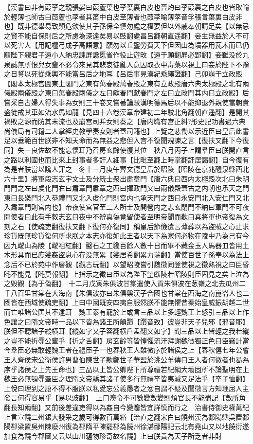 【漢書曰非有葭莩之親張晏曰葭蘆葉也莩葉裏白皮也晉灼曰莩葭裏之白皮也皆取喻於輕薄也師古曰葭蘆也莩者其筩中白皮至薄者也葭莩喻薄莩音孚張言葉裏白皮非也】既非德舉易致顛危欲使其子孫保全慎勿處之權要但以外戚奉朝請足矣【以無忌之賢不能自保則后之所慮為深遠矣易以豉翻處昌呂翻朝直遥翻】妾生無益於人不可以死害人【用記檀弓成子高語意】願勿以丘壟勞費天下但因山為墳器用瓦木而已仍願陛下親君子遠小人納忠諫屏讒慝省作役止遊畋【遠于願翻屛必郢翻】妾雖没於九泉誠無所恨兒女輩不必令來見其悲哀徒亂人意因取衣中毒藥以視上曰妾於陛下不豫之日誓以死從乘輿不能當呂后之地耳【呂后事見漢紀乘繩證翻】己卯崩于立政殿【閣本太極宫圖東上閣門之東有萬春殿萬春殿之東有立政殿唐六典太極殿之北有兩儀殿兩儀殿之東曰萬春殿兩儀之左曰獻春門獻春門之左曰立政門其内曰立政殿】后嘗采自古婦人得失事為女則三十卷又嘗著論駮漢明德馬后以不能抑退外親使當朝貴盛徒戒其車如流水馬如龍【見四十六卷漢章帝建初二年駮北角翻朝直遥翻】是開其禍敗之源而防其末流也及崩宫司并女則奏之【唐内職有宫正糾?彤史記功書過六典尚儀局有司籍二人掌經史教學奏女則者蓋司籍也】上覽之悲慟以示近臣曰皇后此書足以垂範百世朕非不知天命而為無益之悲但入宫不復聞規諫之言【復扶又翻下今復同】失一良佐故不能忘懷耳乃召房玄齡使復其位　秋八月丙子上謂羣臣曰朕開直言之路以利國也而比來上封事者多訐人細事【比毗至翻上時掌翻訐居謁翻】自今復有為是者朕當以讒人罪之　冬十一月庚午葬文德皇后於昭陵【昭陵在京兆醴泉縣西北六十里】將軍段志玄宇文士及分統士衆出肅章門【唐六典曰西内太極殿次北曰朱明門門之左曰䖍化門右曰肅章門肅章之西曰揮政門又曰兩儀殿蓋古之内朝也承天之門東曰長樂門北入恭禮門又北入䖍化門則宫内也承天門之西曰永安門北入安仁門又北入肅章門則宫内也】帝夜使宫官至二人所士及開營内之志玄閉門不納曰軍門不可夜開使者曰此有手敕志玄曰夜中不辨真偽竟留使者至明帝聞而歎曰真將軍也帝復為文刻之石【使疏吏翻復扶又翻下復何亦復同】稱皇后節儉遺言薄葬以為盜賊之心止求珍貨既無珍貨復何所求朕之本志亦復如此王者以天下為家何必物在陵中乃為己有今因九嵕山為陵【嵕祖紅翻】鑿石之工纔百餘人數十日而畢不藏金玉人馬器皿皆用土木形具而已庶幾姦盜息心存没無累【幾居希翻累力瑞翻】當使百世子孫奉以為法上念后不已於苑中作層觀【觀古玩翻】以望昭陵嘗引魏徵同登使視之徵熟視之曰臣昏眊不能見【眊莫報翻】上指示之徵曰臣以為陛下望獻陵若昭陵則臣固見之矣上泣為之毁觀【為于偽翻】　十二月戊寅朱俱波甘棠遣使入貢朱俱波在葱嶺之北去瓜州二千八百里甘棠在大海南【朱俱波亦曰朱俱槃漢子合國也甘棠在西海之南崑崙人也二國皆在西域使疏吏翻】上曰中國既安四夷自服然朕不能無懼昔秦始皇威振胡越二世而亡唯諸公匡其不逮耳　魏王泰有寵於上或言三品以上多輕魏王上怒引三品以上作色讓之曰隋文帝時一品以下皆為諸王所顛躓【躓音致】彼豈非天子兒邪【邪音耶】朕但不聽諸子縱横耳【縱如字又子容翻横戶孟翻又如字】聞三品以上皆輕之我若縱之豈不能折辱公輩乎【折之舌翻】房玄齡等皆惶懼流汗拜謝魏徵獨正色曰臣竊計當今羣臣必無敢輕魏王者在禮臣子一也春秋王人雖微序於諸侯之上【春秋僖七年公會王人齊侯宋公衛侯許男曹伯陳世子款鄭世子華盟於洮公羊傳曰王人者何微者也曷為序乎諸侯之上先王命也】三品以上皆公卿陛下所尊禮若紀綱大壞固所不論聖明在上魏王必無頓辱羣臣之理隋文帝驕其諸子使多行無禮卒皆夷滅又足法乎【卒子恤翻】上悅曰理到之語不得不服朕以私愛忘公義曏者之忿自謂不疑及聞徵言方知理屈人主發言何得容易乎【易以豉翻】　上曰灋令不可數變數變則煩官長不能盡記【數所角翻長知兩翻】又前後差違吏得以為姦自今變灋皆宜詳慎而行之　治書侍御史權萬紀上言宣饒二州銀大發采之歲可得數百萬緡【治直之翻宋白曰饒州漢為鄱陽縣吳置鄱陽郡梁置吳州陳廢州復為郡隋平陳罷郡為饒州徐湛鄱陽記云北有堯山又以地饒衍遂加食為饒今郡圖又云以山川藴物珍奇故名饒】上曰朕貴為天子所乏者非財